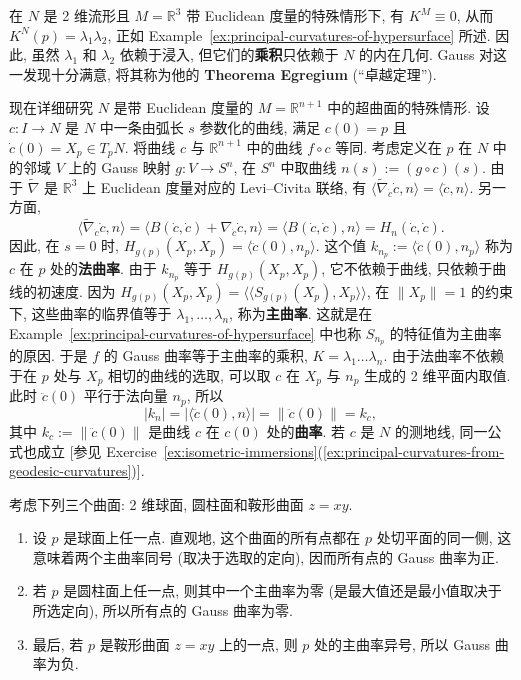 \begin{RiemannExample}\label{ex:theorema-egregium}
在 $N$ 是 2 维流形且 $M=\mathbb{R}^3$ 带 Euclidean 度量的特殊情形下, 有 $K^M\equiv0$, 从而 $K^N(p)=\lambda_1\lambda_2$, 正如 Example~\ref{ex:principal-curvatures-of-hypersurface} 所述. 因此, 虽然 $\lambda_1$ 和 $\lambda_2$ 依赖于浸入, 但它们的\textbf{乘积}只依赖于 $N$ 的内在几何. Gauss 对这一发现十分满意, 将其称为他的 \textbf{Theorema Egregium} (\textquotedblleft 卓越定理\textquotedblright).
\end{RiemannExample}

现在详细研究 $N$ 是带 Euclidean 度量的 $M=\mathbb{R}^{n+1}$ 中的超曲面的特殊情形. 设 $c:I\to N$ 是 $N$ 中一条由弧长 $s$ 参数化的曲线, 满足 $c(0)=p$ 且 $\dot c(0)=X_p\in T_pN$. 将曲线 $c$ 与 $\mathbb{R}^{n+1}$ 中的曲线 $f\circ c$ 等同. 考虑定义在 $p$ 在 $N$ 中的邻域 $V$ 上的 Gauss 映射 $g:V\to S^n$, 在 $S^n$ 中取曲线 $n(s):=(g\circ c)(s)$. 由于 $\widetilde\nabla$ 是 $\mathbb{R}^3$ 上 Euclidean 度量对应的 Levi–Civita 联络, 有 $\langle\widetilde\nabla_{\dot c}\dot c,n\rangle=\langle\ddot c,n\rangle$. 另一方面,
\[
  \langle\widetilde\nabla_{\dot c}\dot c,n\rangle
  =\langle B(\dot c,\dot c)+\nabla_{\dot c}\dot c,n\rangle
  =\langle B(\dot c,\dot c),n\rangle=H_n(\dot c,\dot c).
\]
因此, 在 $s=0$ 时, $H_{g(p)}(X_p,X_p)=\langle\ddot c(0),n_p\rangle$. 这个值 $k_{n_p}:=\langle\ddot c(0),n_p\rangle$ 称为 $c$ 在 $p$ 处的\textbf{法曲率}. 由于 $k_{n_p}$ 等于 $H_{g(p)}(X_p,X_p)$, 它不依赖于曲线, 只依赖于曲线的初速度. 因为 $H_{g(p)}(X_p,X_p)=\langle\!\langle S_{g(p)}(X_p),X_p\rangle\!\rangle$, 在 $\lVert X_p\rVert=1$ 的约束下, 这些曲率的临界值等于 $\lambda_1,\ldots,\lambda_n$, 称为\textbf{主曲率}. 这就是在 Example~\ref{ex:principal-curvatures-of-hypersurface} 中也称 $S_{n_p}$ 的特征值为主曲率的原因. 于是 $f$ 的 Gauss 曲率等于主曲率的乘积, $K=\lambda_1\ldots\lambda_n$. 由于法曲率不依赖于在 $p$ 处与 $X_p$ 相切的曲线的选取, 可以取 $c$ 在 $X_p$ 与 $n_p$ 生成的 2 维平面内取值. 此时 $\ddot c(0)$ 平行于法向量 $n_p$, 所以
\[
  |k_n|=|\langle\ddot c(0),n\rangle|=\lVert\ddot c(0)\rVert=k_c,
\]
其中 $k_c:=\lVert\ddot c(0)\rVert$ 是曲线 $c$ 在 $c(0)$ 处的\textbf{曲率}. 若 $c$ 是 $N$ 的测地线, 同一公式也成立 [参见 Exercise~\ref{ex:isometric-immersions}(\ref{ex:principal-curvatures-from-geodesic-curvatures})].

\begin{RiemannExample}\label{ex:gauss-curvature-sphere-cylinder-saddle}
考虑下列三个曲面: 2 维球面, 圆柱面和鞍形曲面 $z=xy$.
\begin{enumerate}[label=(\arabic*),leftmargin=*]
\item 设 $p$ 是球面上任一点. 直观地, 这个曲面的所有点都在 $p$ 处切平面的同一侧, 这意味着两个主曲率同号 (取决于选取的定向), 因而所有点的 Gauss 曲率为正.
\item 若 $p$ 是圆柱面上任一点, 则其中一个主曲率为零 (是最大值还是最小值取决于所选定向), 所以所有点的 Gauss 曲率为零.
\item 最后, 若 $p$ 是鞍形曲面 $z=xy$ 上的一点, 则 $p$ 处的主曲率异号, 所以 Gauss 曲率为负.
\end{enumerate}
\end{RiemannExample}

